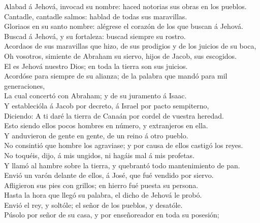  Alabad á Jehová, invocad su nombre: haced notorias sus
obras en los pueblos.\\
 Cantadle, cantadle salmos: hablad de todas sus
maravillas.\\
 Gloriaos en su santo nombre: alégrese el corazón de los que
buscan á Jehová.\\
 Buscad á Jehová, y su fortaleza: buscad siempre su
rostro.\\
 Acordaos de sus maravillas que hizo, de sus prodigios y de
los juicios de su boca,\\
 Oh vosotros, simiente de Abraham su siervo, hijos de Jacob,
sus escogidos.\\
 El es Jehová nuestro Dios; en toda la tierra son sus
juicios.\\
 Acordóse para siempre de su alianza; de la palabra que
mandó para mil generaciones,\\
 La cual concertó con Abraham; y de su juramento á Isaac.\\
 Y establecióla á Jacob por decreto, á Israel por pacto
sempiterno,\\
 Diciendo: A ti daré la tierra de Canaán por cordel de
vuestra heredad.\\
 Esto siendo ellos pocos hombres en número, y extranjeros
en ella.\\
 Y anduvieron de gente en gente, de un reino á otro
pueblo.\\
 No consintió que hombre los agraviase; y por causa de
ellos castigó los reyes.\\
 No toquéis, dijo, á mis ungidos, ni hagáis mal á mis
profetas.\\
 Y llamó al hambre sobre la tierra, y quebrantó todo
mantenimiento de pan.\\
 Envió un varón delante de ellos, á José, que fué vendido
por siervo.\\
 Afligieron sus pies con grillos; en hierro fué puesta su
persona.\\
 Hasta la hora que llegó su palabra, el dicho de Jehová le
probó.\\
 Envió el rey, y soltóle; el señor de los pueblos, y
desatóle.\\
 Púsolo por señor de su casa, y por enseñoreador en toda su
posesión;\\
